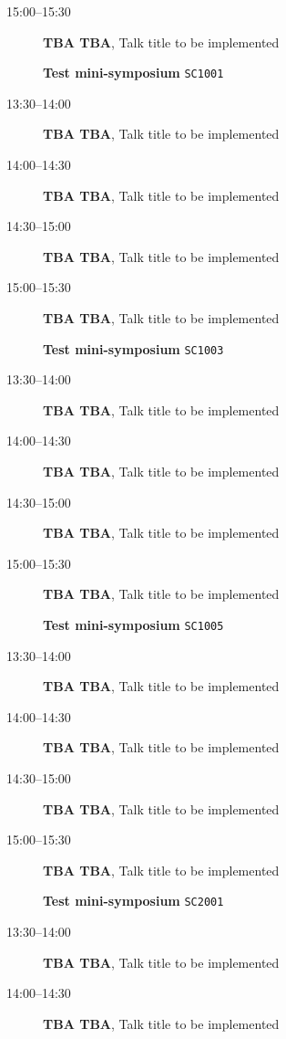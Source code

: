 \documentclass[ILAS2025-program.tex]{subfiles}
\begin{document}
\begin{description}
\begin{description}
        \item[15:00--15:30] \textbf{TBA TBA}, Talk title to be implemented
        \end{description}
    \begin{description}
    \item[] \textbf{Test mini-symposium} {\footnotesize\texttt{SC1001}}
    \item[13:30--14:00] \textbf{TBA TBA}, Talk title to be implemented
        \item[14:00--14:30] \textbf{TBA TBA}, Talk title to be implemented
        \item[14:30--15:00] \textbf{TBA TBA}, Talk title to be implemented
        \item[15:00--15:30] \textbf{TBA TBA}, Talk title to be implemented
        \end{description}
    \begin{description}
    \item[] \textbf{Test mini-symposium} {\footnotesize\texttt{SC1003}}
    \item[13:30--14:00] \textbf{TBA TBA}, Talk title to be implemented
        \item[14:00--14:30] \textbf{TBA TBA}, Talk title to be implemented
        \item[14:30--15:00] \textbf{TBA TBA}, Talk title to be implemented
        \item[15:00--15:30] \textbf{TBA TBA}, Talk title to be implemented
        \end{description}
    \begin{description}
    \item[] \textbf{Test mini-symposium} {\footnotesize\texttt{SC1005}}
    \item[13:30--14:00] \textbf{TBA TBA}, Talk title to be implemented
        \item[14:00--14:30] \textbf{TBA TBA}, Talk title to be implemented
        \item[14:30--15:00] \textbf{TBA TBA}, Talk title to be implemented
        \item[15:00--15:30] \textbf{TBA TBA}, Talk title to be implemented
        \end{description}
    \begin{description}
    \item[] \textbf{Test mini-symposium} {\footnotesize\texttt{SC2001}}
    \item[13:30--14:00] \textbf{TBA TBA}, Talk title to be implemented
        \item[14:00--14:30] \textbf{TBA TBA}, Talk title to be implemented

\end{description}
\end{description}
\end{document}
